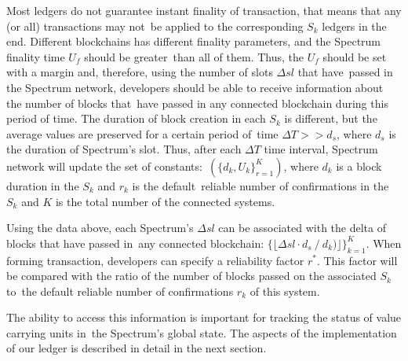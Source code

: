 Most ledgers do not guarantee instant finality of transaction, that means that any (or all) transactions may not\
be applied to the corresponding $S_k$ ledgers in the end.
Different blockchains has different finality parameters, and the Spectrum finality time $U_f$ should be greater\
than all of them.
Thus, the $U_f$ should be set with a margin and, therefore, using the number of slots $\Delta sl$ that have\
passed in the Spectrum network, developers should be able to receive information about the number of blocks that\
have passed in any connected blockchain during this period of time.
The duration of block creation in each $S_k$ is different, but the average values are preserved for a certain period of\
time ${\Delta T >> d_s}$, where $d_s$ is the duration of Spectrum's slot.
Thus, after each $\Delta T$ time interval, Spectrum network will update the set of constants:\
${(\{d_k, U_k\}_{r=1}^{K})}$, where $d_k$ is a block duration in the $S_k$ and $r_k$ is the default\
reliable number of confirmations in the $S_k$ and $K$ is the total number of the connected systems.

Using the data above, each Spectrum's $\Delta sl$ can be associated with the delta of blocks that have passed in\
any connected blockchain: ${\{\lfloor \Delta sl \cdot d_s \mathbin{/} d_k)\rfloor\}_{k=1}^{K}}$.
When forming transaction, developers can specify a reliability factor $r^*$.
This factor will be compared with the ratio of the number of blocks passed on the associated $S_k$ to\
the default reliable number of confirmations $r_k$ of this system.

The ability to access this information is important for tracking the status of value carrying units in\
the Spectrum's global state.
The aspects of the implementation of our ledger is described in detail in the next section.


